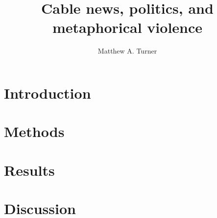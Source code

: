 \documentclass[11pt,letterpaper]{article}
\title{Cable news, politics, and metaphorical violence}
\author{Matthew A. Turner}
\begin{document}
\maketitle


\begin{abstract}

\end{abstract}

\newpage

\section{Introduction}


\section{Methods}
\label{sec:Methods}


\section{Results}
\label{sec:Results}


\section{Discussion}





\setlength{\bibleftmargin}{.125in}
\setlength{\bibindent}{-\bibleftmargin}




% 
\end{document}
